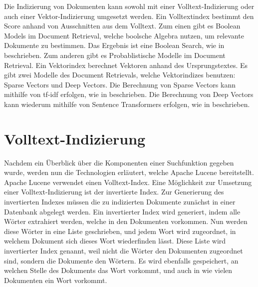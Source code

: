 Die Indizierung von Dokumenten kann sowohl mit einer Volltext-Indizierung oder auch einer Vektor-Indizierung umgesetzt werden.
Ein Volltextindex bestimmt den Score anhand von Ausschnitten aus dem Volltext.
Zum einen gibt es Boolean Models im Document Retrieval, welche boolsche Algebra nutzen, um relevante Dokumente zu bestimmen.
Das Ergebnis ist eine Boolean Search, wie in  beschrieben.
Zum anderen gibt es Probablistische Modelle im Document Retrieval.
Ein Vektorindex berechnet Vektoren anhand des Ursprungstextes.
Es gibt zwei Modelle des Document Retrievals, welche Vektorindizes benutzen: Sparse Vectors und Deep Vectors.
Die Berechnung von Sparse Vectors kann mithilfe von tf-idf erfolgen, wie in  beschrieben.
Die Berechnung von Deep Vectors kann wiederum mithilfe von Sentence Transformers erfolgen, wie in  beschrieben.

\section{Volltext-Indizierung}
\label{chap:volltext-indizierung}
Nachdem ein Überblick über die Komponenten einer Suchfunktion gegeben wurde, werden nun die Technologien erläutert, welche Apache Lucene bereitstellt.
Apache Lucene verwendet einen Volltext-Index.
Eine Möglichkeit zur Umsetzung einer Volltext-Indizierung ist der invertierte Index.
Zur Generierung des invertierten Indexes müssen die zu indizierten Dokumente zunächst in einer Datenbank abgelegt werden.
Ein invertierter Index wird generiert, indem alle Wörter extrahiert werden, welche in den Dokumenten vorkommen.
Nun werden diese Wörter in eine Liste geschrieben, und jedem Wort wird zugeordnet, in welchem Dokument sich dieses Wort wiederfinden lässt.
Diese Liste wird invertierter Index genannt, weil nicht die Wörter den Dokumenten zugeordnet sind, sondern die Dokumente den Wörtern.
Es wird ebenfalls gespeichert, an welchen Stelle des Dokuments das Wort vorkommt, und auch in wie vielen Dokumenten ein Wort vorkommt.\\

